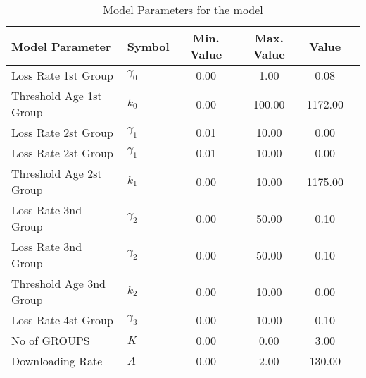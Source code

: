 \begin{table}
\centering
\begin{tabular}{p{5cm}lcccc}
{\bf Model Parameter} & {\bf Symbol} & {\bf Min. Value} & {\bf Max. Value} & {\bf Value}\\
\hline\hline
Loss Rate 1st Group & $\gamma_0$ & 0.00 & 1.00 & 0.08\\
Threshold Age 1st Group & $k_0$ & 0.00 & 100.00 & 1172.00\\
Loss Rate 2st Group & $\gamma_1$ & 0.01 & 10.00 & 0.00\\
Loss Rate 2st Group & $\gamma_1$ & 0.01 & 10.00 & 0.00\\
Threshold Age 2st Group & $k_1$ & 0.00 & 10.00 & 1175.00\\
Loss Rate 3nd Group & $\gamma_2$ & 0.00 & 50.00 & 0.10\\
Loss Rate 3nd Group & $\gamma_2$ & 0.00 & 50.00 & 0.10\\
Threshold Age 3nd Group & $k_2$ & 0.00 & 10.00 & 0.00\\
Loss Rate 4st Group & $\gamma_3$ & 0.00 & 10.00 & 0.10\\
No of GROUPS & $K$ & 0.00 & 0.00 & 3.00\\
Downloading Rate & $A$ & 0.00 & 2.00 & 130.00\\
\hline\hline
\end{tabular}
\caption{Model Parameters for the model}
\end{table}
